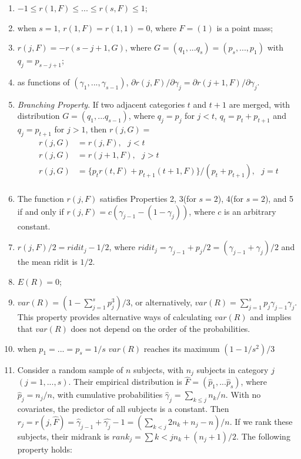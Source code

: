 \documentclass[]{article}
\begin{document}
\begin{enumerate}
	\item $-1\leq r(1, F) \leq ... \leq r(s,F) \leq 1$;
	\item when $s=1$, $r(1,F) = r(1,1)=0$, where $F=(1)$ is a point mass;
	\item $r(j, F) = -r(s-j+1, G)$, where $G=(q_1,...q_s) = (p_s,...,p_1)$ with $q_j=p_{s-j+1}$;
	\item as functions of $(\gamma_1, ..., \gamma_{s-1})$, $\partial r(j,F)/\partial \gamma_j = \partial r(j+1, F)/\partial \gamma_j$.
	\item \textit{Branching Property}. If two adjacent categories $t$ and $t+1$ are merged, with distribution $G=(q_1,...q_{s-1})$, where $q_j=p_j$ for $j<t$, $q_t=p_t + p_{t+1}$ and $q_j=p_{t+1}$ for $j>1$, then $r(j, G)=$
	$$
	\begin{aligned}
		r(j, G)&= r(j, F), ~~~j<t\\
		r(j, G)&= r(j+1, F), ~~~j>t\\
		r(j, G)&= \{ p_t r(t, F) + p_{t+1}(t+1, F) \}/(p_t + p_{t+1}), ~~~j=t\\
		\end{aligned}
		$$
	\item The function $r(j,F)$ satisfies Properties 2, 3(for $s=2$), 4(for $s=2$), and 5 if and only if $r(j,F) = c(\gamma_{j-1} - (1-\gamma_j))$, where $c$ is an arbitrary constant.
	\item $r(j, F)/2 = ridit_j - 1/2$, where $ridit_j = \gamma_{j-1} + p_j/2 = (\gamma_{j-1} + \gamma_j)/2$ and the mean ridit is $1/2$.
	\item $E(R) = 0$;
	\item $var(R) = (1-\sum^s_{j=1} p_j^3)/3$, or alternatively, $var(R) = \sum^s_{j=1} p_j\gamma_{j-1}\gamma_j$. This property provides alternative ways of calculating $var(R)$ and implies that $var(R)$ does not depend on the order of the probabilities.
	\item when $p_1=...=p_s = 1/s$ $var(R)$ reaches its maximum $(1-1/s^2)/3$
	\item Consider a random sample of $n$ subjects, with $n_j$ subjects in category $j$ $(j=1,...,s)$. Their empirical distribution is $\hat{F}=(\hat{p}_1, ... \hat{p}_s)$, where $\hat{p}_j = n_j/n$, with cumulative probabilities $\hat{\gamma}_j = \sum_{k\leq j} n_k/n$. With no covariates, the predictor of all subjects is a constant. Then $r_j = r(j,\hat{F}) = \hat{\gamma}_{j-1} + \hat{\gamma_j} - 1 = \left( \sum_{k<j}2n_k + n_j - n \right)/n$. If we rank these subjects, their midrank is $rank_j = \sum{k<j} n_k + (n_j + 1)/2$. The following property holds:

\end{enumerate}
\end{document}
